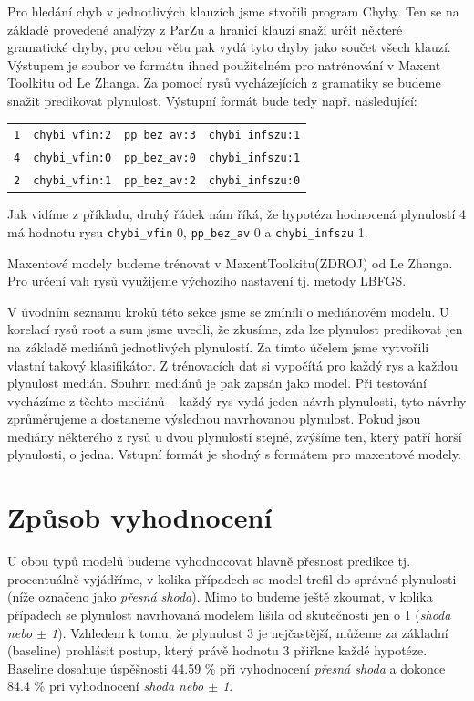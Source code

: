 \documentclass[12pt,a4paper]{report}
\begin{document}
Pro hledání chyb v jednotlivých klauzích jsme stvořili program Chyby. Ten se na základě provedené analýzy z ParZu a hranicí klauzí snaží určit některé gramatické chyby, pro celou větu pak vydá tyto chyby jako součet všech klauzí. Výstupem je soubor ve formátu ihned použitelném pro natrénování v Maxent Toolkitu od Le Zhanga. Za pomocí rysů vycházejících z gramatiky se budeme snažit predikovat plynulost. Výstupní formát bude tedy např. následující:

\begin{center}
\begin{tabular}{llll}
\hline
\texttt{1} & \texttt{chybi\_vfin:2} & \texttt{pp\_bez\_av:3} & \texttt{chybi\_infszu:1} \\
\texttt{4} & \texttt{chybi\_vfin:0} & \texttt{pp\_bez\_av:0} & \texttt{chybi\_infszu:1} \\
\texttt{2} & \texttt{chybi\_vfin:1} & \texttt{pp\_bez\_av:2} & \texttt{chybi\_infszu:0} \\
\hline
\end{tabular}
\end{center}

Jak vidíme z příkladu, druhý řádek nám říká, že hypotéza hodnocená plynulostí 4 má hodnotu rysu \texttt{chybi\_vfin} 0, \texttt{pp\_bez\_av} 0 a \texttt{chybi\_infszu} 1.

Maxentové modely budeme trénovat v MaxentToolkitu(ZDROJ) od Le Zhanga. Pro určení vah rysů využijeme výchozího nastavení tj. metody LBFGS.

V úvodním seznamu kroků této sekce jsme se zmínili o mediánovém modelu. U korelací rysů root a sum jsme uvedli, že zkusíme, zda lze plynulost predikovat jen na základě mediánů jednotlivých plynulostí. Za tímto účelem jsme vytvořili vlastní takový klasifikátor. Z trénovacích dat si vypočítá pro každý rys a každou plynulost medián. Souhrn mediánů je pak zapsán jako model. Při testování vycházíme z těchto mediánů -- každý rys vydá jeden návrh plynulosti, tyto návrhy zprůměrujeme a dostaneme výslednou navrhovanou plynulost. Pokud jsou mediány některého z rysů u dvou plynulostí stejné, zvýšíme ten, který patří horší plynulosti, o jedna. Vstupní formát je shodný s formátem pro maxentové modely.

\section{Způsob vyhodnocení}
U obou typů modelů budeme vyhodnocovat hlavně přesnost predikce tj. procentuálně vyjádříme, v kolika případech se model trefil do správné plynulosti (níže označeno jako \textit{přesná shoda}). Mimo to budeme ještě zkoumat, v kolika případech se plynulost navrhovaná modelem lišila od skutečnosti jen o 1 (\textit{shoda nebo $\pm$ 1}). Vzhledem k tomu, že plynulost 3 je nejčastější, můžeme za základní (baseline) prohlásit postup, který právě hodnotu 3 přiřkne každé hypotéze. Baseline dosahuje úspěšnosti 44.59 \% při vyhodnocení \textit{přesná shoda} a dokonce 84.4 \% pri vyhodnocení \textit{shoda nebo $\pm$ 1}.
\end{document}
